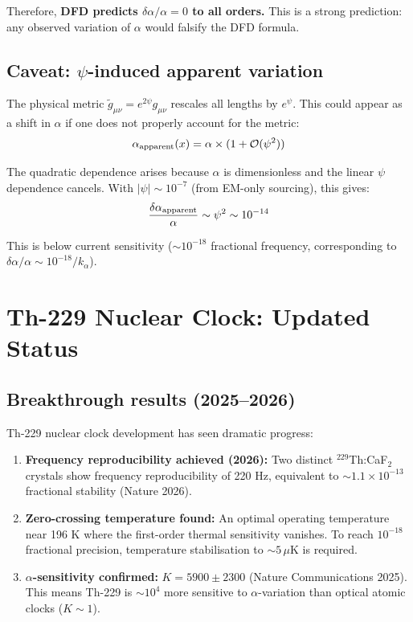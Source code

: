 \documentclass[11pt,a4paper]{article}
\begin{document}
Therefore, \textbf{DFD predicts $\delta\alpha/\alpha = 0$ to all orders.} This is a strong prediction: any observed variation of $\alpha$ would falsify the DFD formula.

\subsection{Caveat: $\psi$-induced apparent variation}

The physical metric $\tilde{g}_{\mu\nu} = e^{2\psi}g_{\mu\nu}$ rescales all lengths by $e^\psi$. This could appear as a shift in $\alpha$ if one does not properly account for the metric:
\begin{equation}
\alpha_{\rm apparent}(x) = \alpha \times (1 + \mathcal{O}(\psi^2))
\end{equation}

The quadratic dependence arises because $\alpha$ is dimensionless and the linear $\psi$ dependence cancels. With $|\psi| \sim 10^{-7}$ (from EM-only sourcing), this gives:
\begin{equation}
\frac{\delta\alpha_{\rm apparent}}{\alpha} \sim \psi^2 \sim 10^{-14}
\end{equation}

This is below current sensitivity ($\sim 10^{-18}$ fractional frequency, corresponding to $\delta\alpha/\alpha \sim 10^{-18}/k_\alpha$).

\section{Th-229 Nuclear Clock: Updated Status}

\subsection{Breakthrough results (2025--2026)}

Th-229 nuclear clock development has seen dramatic progress:

\begin{enumerate}
\item \textbf{Frequency reproducibility achieved (2026):} Two distinct $^{229}$Th:CaF$_2$ crystals show frequency reproducibility of 220 Hz, equivalent to $\sim 1.1 \times 10^{-13}$ fractional stability (Nature 2026).

\item \textbf{Zero-crossing temperature found:} An optimal operating temperature near 196 K where the first-order thermal sensitivity vanishes. To reach $10^{-18}$ fractional precision, temperature stabilisation to $\sim 5\,\mu$K is required.

\item \textbf{$\alpha$-sensitivity confirmed:} $K = 5900 \pm 2300$ (Nature Communications 2025). This means Th-229 is $\sim 10^4$ more sensitive to $\alpha$-variation than optical atomic clocks ($K \sim 1$).
\end{enumerate}
\end{document}
